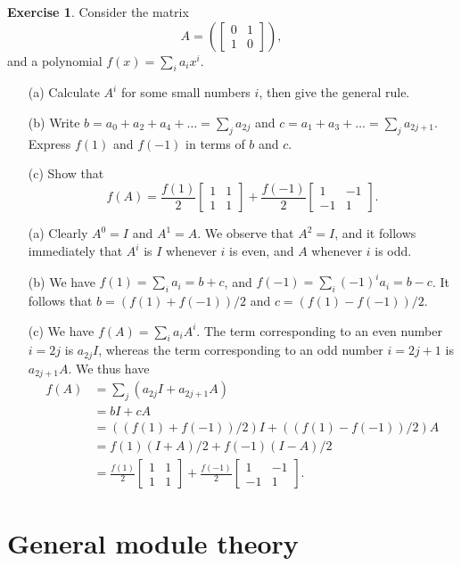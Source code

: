 \documentclass{amsart}
\newcommand{\bbm}       {\left[\begin{matrix}}
\newcommand{\ebm}       {\end{matrix}\right]}
\newcommand{\ip}[1]     {\langle #1\rangle}
\renewcommand{\:}{\colon}
\theoremstyle{definition}
\newtheorem{exercise}{Exercise}[section]
\renewenvironment{solution}{\SolutionAtEnd}{\endSolutionAtEnd}
\begin{document}
\begin{exercise}
 Consider the matrix 
 \[ A = \left(\bbm 0 & 1 \\ 1 & 0 \ebm\right), \]
 and a polynomial $f(x)=\sum_ia_ix^i$.
 \begin{itemize}
  \item[(a)] Calculate $A^i$ for some small numbers $i$, then give the
   general rule.
  \item[(b)] Write $b=a_0+a_2+a_4+\ldots=\sum_ja_{2j}$ and
   $c=a_1+a_3+\ldots=\sum_ja_{2j+1}$.  Express $f(1)$ and $f(-1)$ in
   terms of $b$ and $c$.
  \item[(c)] Show that
   \[ f(A) =
      \frac{f(1)}{2}\bbm 1&1\\1&1\ebm +
      \frac{f(-1)}{2}\bbm 1&-1\\-1&1\ebm.
   \]
 \end{itemize}
\end{exercise}
\begin{solution}
 \begin{itemize}
  \item[(a)] Clearly $A^0=I$ and $A^1=A$.  We observe that $A^2=I$,
   and it follows immediately that $A^i$ is $I$ whenever $i$ is even,
   and $A$ whenever $i$ is odd.
  \item[(b)] We have $f(1)=\sum_ia_i=b+c$, and
   $f(-1)=\sum_i(-1)^ia_i=b-c$.  It follows that $b=(f(1)+f(-1))/2$
   and $c=(f(1)-f(-1))/2$.
  \item[(c)] We have $f(A)=\sum_ia_iA^i$.  The term corresponding to
   an even number $i=2j$ is $a_{2j}I$, whereas the term corresponding
   to an odd number $i=2j+1$ is $a_{2j+1}A$.  We thus have 
   \begin{align*}
    f(A) &= \sum_j (a_{2j} I + a_{2j+1} A)  \\
         &= b I + c A \\
         &= ((f(1) + f(-1))/2) I + ((f(1) - f(-1))/2) A \\
         &= f(1) (I + A)/2 + f(-1) (I - A)/2 \\
         &= \frac{f(1)}{2}\bbm 1&1\\1&1\ebm +
            \frac{f(-1)}{2}\bbm 1&-1\\-1&1\ebm.
   \end{align*}
 \end{itemize}
\end{solution}

\section{General module theory}
\label{sec-general-modules}
\end{document}
